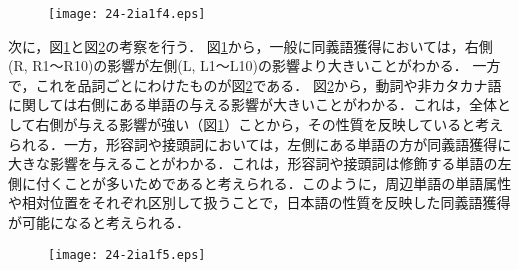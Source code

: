 \documentclass[japanese]{jnlp_1.4}
\begin{document}
\begin{figure}[b]
\begin{center}
\texttt{[image: 24-2ia1f4.eps]}
\end{center}
\label{fig:append-LR}
\end{figure}

次に，図\ref{fig:append-LR}と図\ref{fig:append-POS-LR}の考察を行う．
図\ref{fig:append-LR}から，一般に同義語獲得においては，右側(R, R1〜R10)の影響が左側(L, L1〜L10)の影響より大きいことがわかる．
一方で，これを品詞ごとにわけたものが図\ref{fig:append-POS-LR}である．
図\ref{fig:append-POS-LR}から，動詞や非カタカナ語に関しては右側にある単語の与える影響が大きいことがわかる．これは，全体として右側が与える影響が強い（図\ref{fig:append-LR}）ことから，その性質を反映していると考えられる．一方，形容詞や接頭詞においては，左側にある単語の方が同義語獲得に大きな影響を与えることがわかる．これは，形容詞や接頭詞は修飾する単語の左側に付くことが多いためであると考えられる．このように，周辺単語の単語属性や相対位置をそれぞれ区別して扱うことで，日本語の性質を反映した同義語獲得が可能になると考えられる．

\begin{figure}[b]
\begin{center}
\texttt{[image: 24-2ia1f5.eps]}
\end{center}
\label{fig:append-POS-LR}
\end{figure}

\begin{table}[b]
\begin{minipage}[t]{162pt}
\setlength{\captionwidth}{162pt}
\label{tb:katakana} 

\end{minipage}
\hfill
\begin{minipage}[t]{243pt}
\setlength{\captionwidth}{243pt}
\label{tb:katakana-synonym}

\end{minipage}
\end{table}
\end{document}
